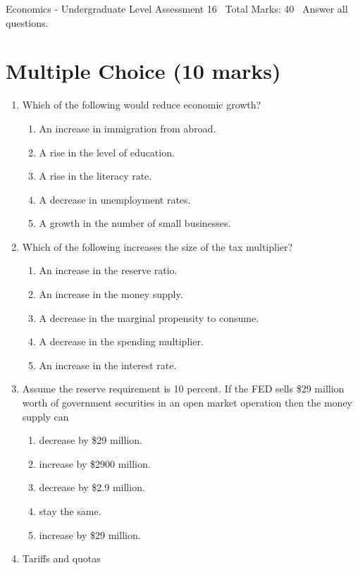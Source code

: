 \documentclass[12pt]{article}
\begin{document}
\begin{center}
Economics - Undergraduate Level Assessment 16 \
Total Marks: 40 \
Answer all questions.
\end{center}

\section*{Multiple Choice (10 marks)}
\begin{enumerate}[label=\arabic*.]
\item Which of the following would reduce economic growth?
\begin{enumerate}[label=(\alph*)]
    \item An increase in immigration from abroad.
    \item A rise in the level of education.
    \item A rise in the literacy rate.
    \item A decrease in unemployment rates.
    \item A growth in the number of small businesses.
\end{enumerate}
\item Which of the following increases the size of the tax multiplier?
\begin{enumerate}[label=(\alph*)]
    \item An increase in the reserve ratio.
    \item An increase in the money supply.
    \item A decrease in the marginal propensity to consume.
    \item A decrease in the spending multiplier.
    \item An increase in the interest rate.
\end{enumerate}
\item Assume the reserve requirement is 10 percent. If the FED sells \$29 million worth of government securities in an open market operation then the money supply can
\begin{enumerate}[label=(\alph*)]
    \item decrease by \$29 million.
    \item increase by \$2900 million.
    \item decrease by \$2.9 million.
    \item stay the same.
    \item increase by \$29 million.
\end{enumerate}
\item Tariffs and quotas

\end{enumerate}
\end{document}
